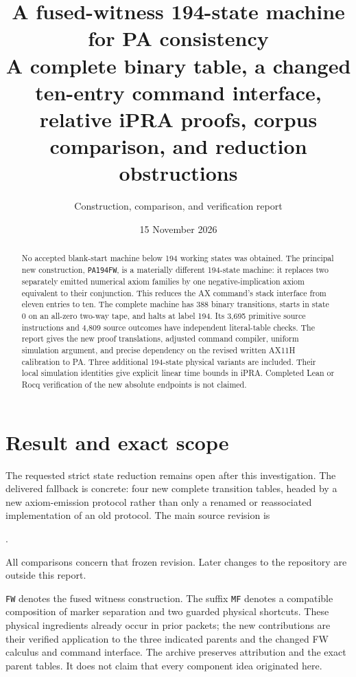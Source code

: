 \documentclass[11pt,a4paper]{article}
\title{A fused-witness 194-state machine\\for PA consistency\\[5pt]
\large A complete binary table, a changed ten-entry command interface,\\
relative iPRA proofs, corpus comparison, and reduction obstructions}
\author{Construction, comparison, and verification report}
\date{15 November 2026}
\theoremstyle{definition}\newtheorem{definition}[theorem]{Definition}
\theoremstyle{remark}\newtheorem{remark}[theorem]{Remark}
\begin{document}
\maketitle
\begin{abstract}
No accepted blank-start machine below 194 working states was obtained.
The principal new construction, \texttt{PA194FW}, is a materially different
194-state machine: it replaces two separately emitted numerical axiom
families by one negative-implication axiom equivalent to their conjunction.
This reduces the AX command's stack interface from eleven entries to ten.
The complete machine has 388 binary transitions, starts in state 0 on an
all-zero two-way tape, and halts at label 194. Its 3,695 primitive source
instructions and 4,809 source outcomes have independent literal-table
checks. The report gives the new proof translations, adjusted command
compiler, uniform simulation argument, and precise dependency on the
revised written AX11H calibration to PA. Three additional 194-state
physical variants are included. Their local simulation identities give
explicit linear time bounds in iPRA. Completed Lean or Rocq verification
of the new absolute endpoints is not claimed.
\end{abstract}
\tableofcontents
\newpage

\section{Result and exact scope}

The requested strict state reduction remains open after this investigation.
The delivered fallback is concrete: four new complete transition tables,
headed by a new axiom-emission protocol rather than only a renamed or
reassociated implementation of an old protocol. The main source revision is
\begin{center}\small{}.\end{center}
All comparisons concern that frozen revision. Later changes to the repository
are outside this report.



\texttt{FW} denotes the fused witness construction. The suffix
\texttt{MF} denotes a compatible composition of marker separation and two
guarded physical shortcuts. These physical ingredients already occur in
prior packets; the new contributions are their verified application to
the three indicated parents and the changed FW calculus and
command interface. The archive preserves attribution and the exact parent
tables. It does not claim that every component idea originated here.
\end{document}
